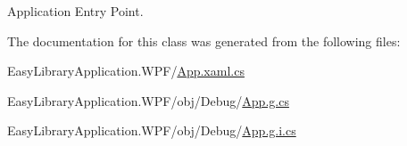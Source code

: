 Application Entry Point. 



The documentation for this class was generated from the following files\+:\begin{DoxyCompactItemize}
\item 
Easy\+Library\+Application.\+W\+P\+F/\mbox{\hyperlink{_app_8xaml_8cs}{App.\+xaml.\+cs}}\item 
Easy\+Library\+Application.\+W\+P\+F/obj/\+Debug/\mbox{\hyperlink{_debug_2_app_8g_8cs}{App.\+g.\+cs}}\item 
Easy\+Library\+Application.\+W\+P\+F/obj/\+Debug/\mbox{\hyperlink{_app_8g_8i_8cs}{App.\+g.\+i.\+cs}}\end{DoxyCompactItemize}
